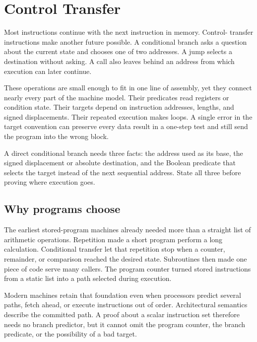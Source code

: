 \chapter{Control Transfer}
\label{ch:control-transfer}

Most instructions continue with the next instruction in memory. Control-
transfer instructions make another future possible. A conditional branch asks
a question about the current state and chooses one of two addresses. A jump
selects a destination without asking. A call also leaves behind an address
from which execution can later continue.

These operations are small enough to fit in one line of assembly, yet they
connect nearly every part of the machine model. Their predicates read
registers or condition state. Their targets depend on instruction addresses,
lengths, and signed displacements. Their repeated execution makes loops. A
single error in the target convention can preserve every data result in a
one-step test and still send the program into the wrong block.

\begin{keyidea}[title={Control flow is arithmetic over addresses plus a predicate}]
A direct conditional branch needs three facts: the address used as its base,
the signed displacement or absolute destination, and the Boolean predicate
that selects the target instead of the next sequential address. State all three
before proving where execution goes.
\end{keyidea}

\section{Why programs choose}

The earliest stored-program machines already needed more than a straight
list of arithmetic operations. Repetition made a short program perform a long
calculation. Conditional transfer let that repetition stop when a counter,
remainder, or comparison reached the desired state. Subroutines then made one
piece of code serve many callers. The program counter turned stored
instructions from a static list into a path selected during execution.

Modern machines retain that foundation even when processors predict several
paths, fetch ahead, or execute instructions out of order. Architectural
semantics describe the committed path. A proof about a scalar instruction
set therefore needs no branch predictor, but it cannot omit the program
counter, the branch predicate, or the possibility of a bad target.

